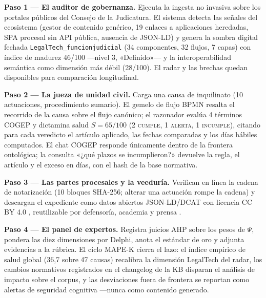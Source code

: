 \documentclass[computers,article,submit,pdftex,moreauthors]{Definitions/mdpi}
\begin{document}
\textbf{Paso 1 --- El auditor de gobernanza.} Ejecuta la ingesta no invasiva sobre los portales públicos del Consejo de la Judicatura. El sistema detecta las señales del ecosistema (gestor de contenido genérico, 19 enlaces a aplicaciones heredadas, SPA procesal sin API pública, ausencia de JSON-LD) y genera la sombra digital fechada \texttt{LegalTech\_funcionjudicial} (34 componentes, 32 flujos, 7 capas) con índice de madurez 46/100 ---nivel 3, «Definido»--- y la interoperabilidad semántica como dimensión más débil (28/100). El radar y las brechas quedan disponibles para comparación longitudinal.

\textbf{Paso 2 --- La jueza de unidad civil.} Carga una causa de inquilinato (10 actuaciones, procedimiento sumario). El gemelo de flujo BPMN resalta el recorrido de la causa sobre el flujo canónico; el razonador evalúa 4 términos COGEP y dictamina salud $S = 65/100$ (2 \textsc{cumple}, 1 \textsc{alerta}, 1 \textsc{incumple}), citando para cada veredicto el artículo aplicado, las fechas comparadas y los días hábiles computados. El chat COGEP responde únicamente dentro de la frontera ontológica; la consulta «¿qué plazos se incumplieron?» devuelve la regla, el artículo y el exceso en días, con el hash de la base normativa.

\textbf{Paso 3 --- Las partes procesales y la veeduría.} Verifican en línea la cadena de notarización (10 bloques SHA-256; alterar una actuación rompe la cadena) y descargan el expediente como datos abiertos JSON-LD/DCAT con licencia CC BY 4.0 \cite{Bizer2009,Wilkinson2016}, reutilizable por defensoría, academia y prensa \cite{Attard2015}.

\textbf{Paso 4 --- El panel de expertos.} Registra juicios AHP sobre los pesos de $\Psi$, pondera las diez dimensiones por Delphi, anota el estándar de oro y adjunta evidencias a la rúbrica. El ciclo MAPE-K cierra el lazo: el índice empírico de salud global (36{,}7 sobre 47 causas) recalibra la dimensión LegalTech del radar, los cambios normativos registrados en el changelog de la KB disparan el análisis de impacto sobre el corpus, y las desviaciones fuera de frontera se reportan como alertas de seguridad cognitiva ---nunca como contenido generado.
\end{document}
